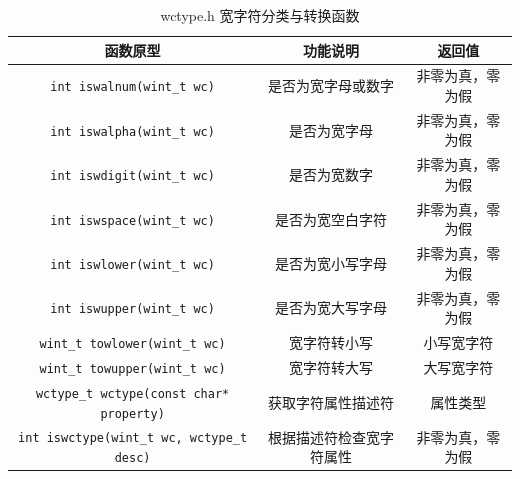 \begin{table}[H]
\centering
\small
\renewcommand{\arraystretch}{1.5}
\begin{tabulary}{\linewidth}{CCC}
\toprule
\textbf{函数原型} & \textbf{功能说明} & \textbf{返回值} \\ \midrule
\texttt{int iswalnum(wint\_t wc)} & 是否为宽字母或数字 & 非零为真，零为假 \\ 
\texttt{int iswalpha(wint\_t wc)} & 是否为宽字母 & 非零为真，零为假 \\ 
\texttt{int iswdigit(wint\_t wc)} & 是否为宽数字 & 非零为真，零为假 \\ 
\texttt{int iswspace(wint\_t wc)} & 是否为宽空白字符 & 非零为真，零为假 \\ 
\texttt{int iswlower(wint\_t wc)} & 是否为宽小写字母 & 非零为真，零为假 \\ 
\texttt{int iswupper(wint\_t wc)} & 是否为宽大写字母 & 非零为真，零为假 \\ 
\texttt{wint\_t towlower(wint\_t wc)} & 宽字符转小写 & 小写宽字符 \\ 
\texttt{wint\_t towupper(wint\_t wc)} & 宽字符转大写 & 大写宽字符 \\ 
\texttt{wctype\_t wctype(const char* property)} & 获取字符属性描述符 & 属性类型 \\ 
\texttt{int iswctype(wint\_t wc, wctype\_t desc)} & 根据描述符检查宽字符属性 & 非零为真，零为假 \\ \bottomrule
\end{tabulary}
\caption{wctype.h 宽字符分类与转换函数}
\label{tab:wctype}
\end{table}

